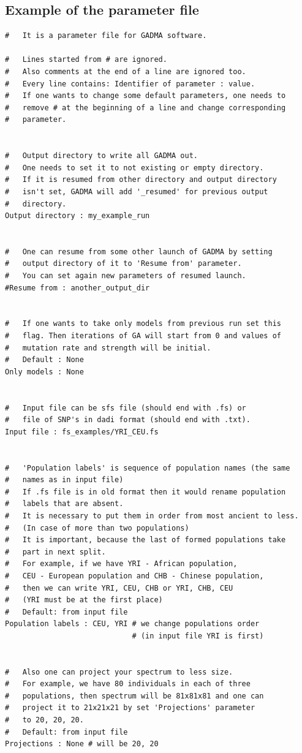 \documentclass[12pt]{article}
\begin{document}
\newpage
\begin{appendices}
\section{Example of the parameter file}
\label{sec:example-params}
\begin{lstlisting}
#   It is a parameter file for GADMA software.

#   Lines started from # are ignored.
#   Also comments at the end of a line are ignored too.
#   Every line contains: Identifier of parameter : value.
#   If one wants to change some default parameters, one needs to
#   remove # at the beginning of a line and change corresponding
#   parameter.


#   Output directory to write all GADMA out.
#   One needs to set it to not existing or empty directory.
#   If it is resumed from other directory and output directory 
#   isn't set, GADMA will add '_resumed' for previous output 
#   directory.
Output directory : my_example_run


#   One can resume from some other launch of GADMA by setting
#   output directory of it to 'Resume from' parameter.
#   You can set again new parameters of resumed launch.
#Resume from : another_output_dir


#   If one wants to take only models from previous run set this 
#   flag. Then iterations of GA will start from 0 and values of
#   mutation rate and strength will be initial.
#   Default : None
Only models : None


#   Input file can be sfs file (should end with .fs) or 
#   file of SNP's in dadi format (should end with .txt).
Input file : fs_examples/YRI_CEU.fs


#   'Population labels' is sequence of population names (the same
#   names as in input file)
#   If .fs file is in old format then it would rename population 
#   labels that are absent.
#   It is necessary to put them in order from most ancient to less. 
#   (In case of more than two populations)
#   It is important, because the last of formed populations take
#   part in next split.
#   For example, if we have YRI - African population,
#   CEU - European population and CHB - Chinese population,
#   then we can write YRI, CEU, CHB or YRI, CHB, CEU 
#   (YRI must be at the first place)
#   Default: from input file
Population labels : CEU, YRI # we change populations order 
                             # (in input file YRI is first)


#   Also one can project your spectrum to less size.
#   For example, we have 80 individuals in each of three 
#   populations, then spectrum will be 81x81x81 and one can 
#   project it to 21x21x21 by set 'Projections' parameter 
#   to 20, 20, 20.
#   Default: from input file
Projections : None # will be 20, 20



\end{lstlisting}
\end{appendices}
\end{document}
